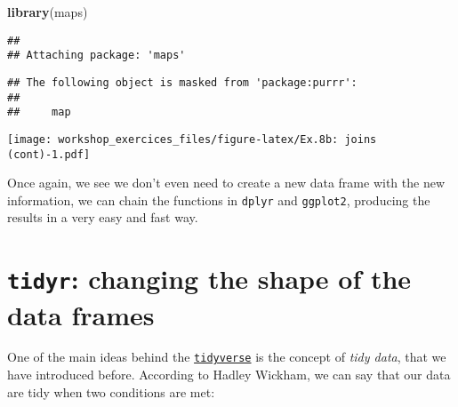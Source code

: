 \documentclass[]{article}
\newenvironment{Shaded}{\begin{snugshade}}{\end{snugshade}}
\newcommand{\KeywordTok}[1]{\textcolor[rgb]{0.13,0.29,0.53}{\textbf{#1}}}
\newcommand{\DataTypeTok}[1]{\textcolor[rgb]{0.13,0.29,0.53}{#1}}
\newcommand{\FloatTok}[1]{\textcolor[rgb]{0.00,0.00,0.81}{#1}}
\newcommand{\StringTok}[1]{\textcolor[rgb]{0.31,0.60,0.02}{#1}}
\newcommand{\OperatorTok}[1]{\textcolor[rgb]{0.81,0.36,0.00}{\textbf{#1}}}
\newcommand{\NormalTok}[1]{#1}
\begin{document}
\begin{Shaded}
\begin{Highlighting}[]
\KeywordTok{library}\NormalTok{(maps)}
\end{Highlighting}
\end{Shaded}

\begin{verbatim}
## 
## Attaching package: 'maps'
\end{verbatim}

\begin{verbatim}
## The following object is masked from 'package:purrr':
## 
##     map
\end{verbatim}

\begin{Shaded}
\end{Shaded}

\texttt{[image: workshop\_exercices\_files/figure-latex/Ex.8b: joins (cont)-1.pdf]}

Once again, we see we don't even need to create a new data frame with
the new information, we can chain the functions in \texttt{dplyr} and
\texttt{ggplot2}, producing the results in a very easy and fast way.

\newpage

\section{\texorpdfstring{\texttt{tidyr}: changing the shape of the data
frames}{tidyr: changing the shape of the data frames}}\label{tidyr-changing-the-shape-of-the-data-frames}

One of the main ideas behind the
\href{https://cran.r-project.org/web/packages/tidyverse/index.html}{\texttt{tidyverse}}
is the concept of \emph{tidy data}, that we have introduced before.
According to Hadley Wickham, we can say that our data are tidy when two
conditions are met:
\end{document}
